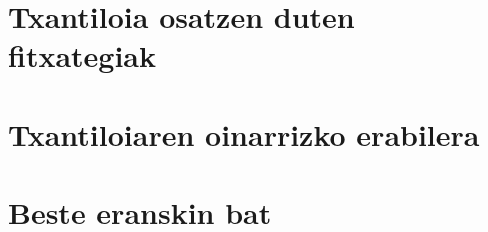 %

\clearpage
\section{Txantiloia osatzen duten fitxategiak}
\label{att:atta}


\clearpage
\section{Txantiloiaren oinarrizko erabilera}
\label{att:attb}


\clearpage
\section{Beste eranskin bat}
\label{att:attc}
